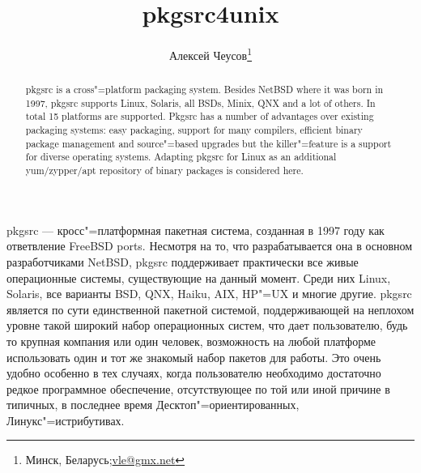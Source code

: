 \documentclass[10pt, a5paper]{article}
\begin{document}
\title{pkgsrc4unix}%

\author{Алексей Чеусов\footnote{Минск, Беларусь;\url{vle@gmx.net}}}
\maketitle

\begin{abstract}
pkgsrc is a cross"=platform packaging system. Besides NetBSD where it was born in 1997, pkgsrc supports Linux, Solaris, all BSDs, Minix, QNX and a lot of others. In total 15 platforms are supported. Pkgsrc has a number of advantages over existing packaging systems: easy packaging, support for many compilers, efficient binary package management and source"=based upgrades but the killer"=feature is a support for diverse operating systems. Adapting pkgsrc for Linux as an additional yum/zypper/apt repository of binary packages is considered here.
\end{abstract}

pkgsrc --- кросс"=платформная пакетная система, созданная в 1997 году как ответвление FreeBSD ports. Несмотря на то, что разрабатывается она в основном разработчиками NetBSD, pkgsrc поддерживает практически все живые операционные системы, существующие на данный момент. Среди них Linux, Solaris, все варианты BSD, QNX, Haiku, AIX, HP"=UX и многие другие. pkgsrc является по сути единственной пакетной системой, поддерживающей на неплохом уровне такой широкий набор операционных систем, что дает пользователю, будь то крупная компания или один человек, возможность на любой платформе использовать один и тот же знакомый набор пакетов для работы. Это очень удобно особенно в тех случаях, когда пользователю необходимо достаточно редкое программное обеспечение, отсутствующее по той или иной причине в типичных, в последнее время Десктоп"=ориентированных, Линукс"=истрибутивах.
\end{document}
